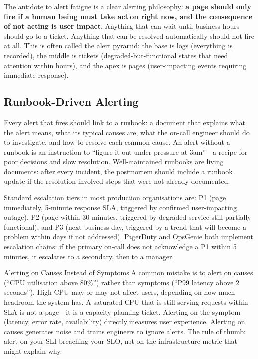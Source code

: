 \documentclass[11pt,a4paper]{article}
\begin{document}
The antidote to alert fatigue is a clear alerting philosophy: \textbf{a page should only fire if a human being must take action right now, and the consequence of not acting is user impact}. Anything that can wait until business hours should go to a ticket. Anything that can be resolved automatically should not fire at all. This is often called the alert pyramid: the base is logs (everything is recorded), the middle is tickets (degraded-but-functional states that need attention within hours), and the apex is pages (user-impacting events requiring immediate response).

\subsection{Runbook-Driven Alerting}

Every alert that fires should link to a runbook: a document that explains what the alert means, what its typical causes are, what the on-call engineer should do to investigate, and how to resolve each common cause. An alert without a runbook is an instruction to ``figure it out under pressure at 3am''---a recipe for poor decisions and slow resolution. Well-maintained runbooks are living documents: after every incident, the postmortem should include a runbook update if the resolution involved steps that were not already documented.

Standard escalation tiers in most production organisations are: P1 (page immediately, 5-minute response SLA, triggered by confirmed user-impacting outage), P2 (page within 30 minutes, triggered by degraded service still partially functional), and P3 (next business day, triggered by a trend that will become a problem within days if not addressed). PagerDuty and OpsGenie both implement escalation chains: if the primary on-call does not acknowledge a P1 within 5 minutes, it escalates to a secondary, then to a manager.

\begin{trapbox}{Alerting on Causes Instead of Symptoms}
  A common mistake is to alert on causes (``CPU utilisation above 80\%'') rather than symptoms (``P99 latency above 2 seconds''). High CPU may or may not affect users, depending on how much headroom the system has. A saturated CPU that is still serving requests within SLA is not a page---it is a capacity planning ticket. Alerting on the symptom (latency, error rate, availability) directly measures user experience. Alerting on causes generates noise and trains engineers to ignore alerts. The rule of thumb: alert on your SLI breaching your SLO, not on the infrastructure metric that might explain why.
\end{trapbox}
\end{document}
